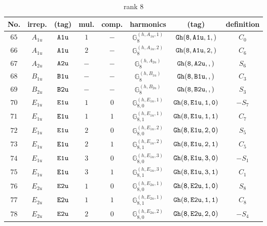 \documentclass[fleqn,8pt]{jsarticle}
\begin{document}
\begin{table}[ht!]
\begin{center}
\caption{rank 8}
\renewcommand{\arraystretch}{1.3}
\begin{tabular}{cccccccc} \hline \hline
No. & irrep. & (tag) & mul. & comp. & harmonics & (tag) & definition \\ \hline
$ 65 $ & $ A_{1u} $ & $ {\tt A1u} $ & $ 1 $ & $ - $ & $ \mathbb{G}_{8}^{(h,A_{1u},1)} $ & $ {\tt Gh(8,A1u,1,)} $ & $ C_{0} $ \\
$ 66 $ & $ A_{1u} $ & $ {\tt A1u} $ & $ 2 $ & $ - $ & $ \mathbb{G}_{8}^{(h,A_{1u},2)} $ & $ {\tt Gh(8,A1u,2,)} $ & $ C_{6} $ \\
$ 67 $ & $ A_{2u} $ & $ {\tt A2u} $ & $ - $ & $ - $ & $ \mathbb{G}_{8}^{(h,A_{2u})} $ & $ {\tt Gh(8,A2u,,)} $ & $ S_{6} $ \\
$ 68 $ & $ B_{1u} $ & $ {\tt B1u} $ & $ - $ & $ - $ & $ \mathbb{G}_{8}^{(h,B_{1u})} $ & $ {\tt Gh(8,B1u,,)} $ & $ C_{3} $ \\
$ 69 $ & $ B_{2u} $ & $ {\tt B2u} $ & $ - $ & $ - $ & $ \mathbb{G}_{8}^{(h,B_{2u})} $ & $ {\tt Gh(8,B2u,,)} $ & $ S_{3} $ \\
$ 70 $ & $ E_{1u} $ & $ {\tt E1u} $ & $ 1 $ & $ 0 $ & $ \mathbb{G}_{8,0}^{(h,E_{1u},1)} $ & $ {\tt Gh(8,E1u,1,0)} $ & $ - S_{7} $ \\
$ 71 $ & $ E_{1u} $ & $ {\tt E1u} $ & $ 1 $ & $ 1 $ & $ \mathbb{G}_{8,1}^{(h,E_{1u},1)} $ & $ {\tt Gh(8,E1u,1,1)} $ & $ C_{7} $ \\
$ 72 $ & $ E_{1u} $ & $ {\tt E1u} $ & $ 2 $ & $ 0 $ & $ \mathbb{G}_{8,0}^{(h,E_{1u},2)} $ & $ {\tt Gh(8,E1u,2,0)} $ & $ S_{5} $ \\
$ 73 $ & $ E_{1u} $ & $ {\tt E1u} $ & $ 2 $ & $ 1 $ & $ \mathbb{G}_{8,1}^{(h,E_{1u},2)} $ & $ {\tt Gh(8,E1u,2,1)} $ & $ C_{5} $ \\
$ 74 $ & $ E_{1u} $ & $ {\tt E1u} $ & $ 3 $ & $ 0 $ & $ \mathbb{G}_{8,0}^{(h,E_{1u},3)} $ & $ {\tt Gh(8,E1u,3,0)} $ & $ - S_{1} $ \\
$ 75 $ & $ E_{1u} $ & $ {\tt E1u} $ & $ 3 $ & $ 1 $ & $ \mathbb{G}_{8,1}^{(h,E_{1u},3)} $ & $ {\tt Gh(8,E1u,3,1)} $ & $ C_{1} $ \\
$ 76 $ & $ E_{2u} $ & $ {\tt E2u} $ & $ 1 $ & $ 0 $ & $ \mathbb{G}_{8,0}^{(h,E_{2u},1)} $ & $ {\tt Gh(8,E2u,1,0)} $ & $ S_{8} $ \\
$ 77 $ & $ E_{2u} $ & $ {\tt E2u} $ & $ 1 $ & $ 1 $ & $ \mathbb{G}_{8,1}^{(h,E_{2u},1)} $ & $ {\tt Gh(8,E2u,1,1)} $ & $ C_{8} $ \\
$ 78 $ & $ E_{2u} $ & $ {\tt E2u} $ & $ 2 $ & $ 0 $ & $ \mathbb{G}_{8,0}^{(h,E_{2u},2)} $ & $ {\tt Gh(8,E2u,2,0)} $ & $ - S_{4} $ \\

\end{tabular}
\end{center}
\end{table}
\end{document}

